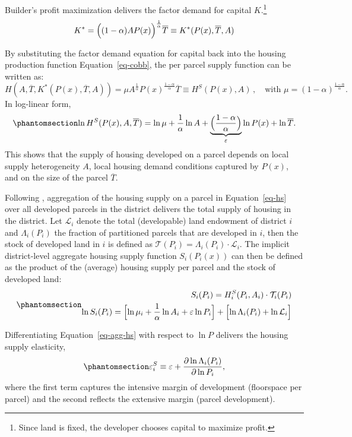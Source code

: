 \documentclass[
  12pt,
]{article}
\begin{document}
Builder's profit maximization delivers the factor demand for capital
\(K\).\footnote{Since land is fixed, the developer chooses capital to
  maximize profit.} \[
 K^* = \Bigl((1-\alpha)AP(x)\Bigr)^{\frac{1}{\alpha}}\overline{T}\equiv K^*(P(x), \overline{T}, A) 
\]

By substituting the factor demand equation for capital back into the
housing production function Equation~\ref{eq-cobb}, the per parcel
supply function can be written as: \[
H(A, \overline{T}, K^*(P(x), \overline{T}, A))=\mu A^{\frac{1}{\alpha}}{P(x)}^{\frac{1-\alpha}{\alpha}}\overline{T} \equiv H^S(P(x), A)\,,\quad \text{with } \mu = (1-\alpha)^{\frac{1-\alpha}{\alpha}}.
\] In log-linear form,
\begin{equation}\protect\phantomsection\label{eq-hs}{ 
\ln H^S(P(x), A, \overline{T}) = \ln \mu + \frac{1}{\alpha}\ln A + \underbrace{\Bigl(\frac{1-\alpha}{\alpha}\Bigr)}_{\varepsilon}\ln P(x) + \ln \overline{T}.
}\end{equation} This shows that the supply of housing developed on a
parcel depends on local supply heterogeneity \(A\), local housing demand
conditions captured by \(P(x)\), and on the size of the parcel
\(\overline{T}\).

Following \citet{baum-snow_han_2019}, aggregation of the housing supply
on a parcel in Equation~\ref{eq-hs} over all developed parcels in the
district delivers the total supply of housing in the district. Let
\(\mathcal{L}_{i}\) denote the total (developable) land endowment of
district \(i\) and \(\Lambda_i (P_i)\) the fraction of partitioned
parcels that are developed in \(i\), then the stock of developed land in
\(i\) is defined as
\(\mathcal{T}(P_i) = \Lambda_i(P_i) \cdot \mathcal{L}_{i}\). The
implicit district-level aggregate housing supply function
\(S_i(P_i(x))\) can then be defined as the product of the (average)
housing supply per parcel and the stock of developed land:
\begin{equation}\protect\phantomsection\label{eq-agg-hs}{
\begin{aligned}
S_i(P_i) = H_i^S(P_i, A_i)\cdot \mathcal{T}_{i}(P_i)\\ 
\ln S_i(P_i) = \Bigl[\ln \mu_i + \frac{1}{\alpha}\ln A_i + \varepsilon\ln P_i \Bigr]+ \Bigl[\ln\Lambda_i(P_i) + \ln\mathcal{L}_i\Bigr]
\end{aligned} 
}\end{equation}

Differentiating Equation~\ref{eq-agg-hs} with respect to \(\ln P\)
delivers the housing supply elasticity,
\begin{equation}\protect\phantomsection\label{eq-elasticity}{
\varepsilon^S_{i} \equiv \varepsilon + \frac{\partial \ln\Lambda_i(P_i)}{\partial \ln P_i},
}\end{equation} where the first term captures the intensive margin of
development (floorspace per parcel) and the second reflects the
extensive margin (parcel development).
\end{document}
